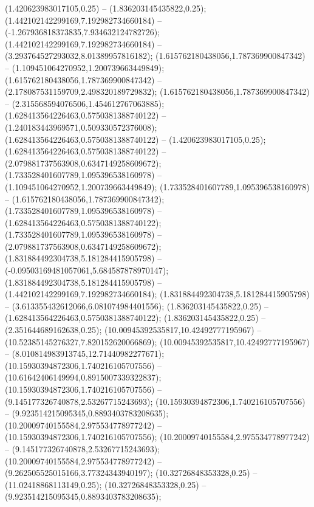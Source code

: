  (1.420623983017105,0.25) -- (1.836203145435822,0.25);
 (1.442102142299169,7.192982734660184) -- (-1.267936818373835,7.934632124782726);
 (1.442102142299169,7.192982734660184) -- (3.293764527293032,8.01389957816182);
 (1.615762180438056,1.787369900847342) -- (1.109451064270952,1.200739663449849);
 (1.615762180438056,1.787369900847342) -- (2.178087531159709,2.498320189729832);
 (1.615762180438056,1.787369900847342) -- (2.315568594076506,1.454612767063885);
 (1.628413564226463,0.5750381388740122) -- (1.240183443969571,0.509330572376008);
 (1.628413564226463,0.5750381388740122) -- (1.420623983017105,0.25);
 (1.628413564226463,0.5750381388740122) -- (2.079881737563908,0.6347149258609672);
 (1.733528401607789,1.095396538160978) -- (1.109451064270952,1.200739663449849);
 (1.733528401607789,1.095396538160978) -- (1.615762180438056,1.787369900847342);
 (1.733528401607789,1.095396538160978) -- (1.628413564226463,0.5750381388740122);
 (1.733528401607789,1.095396538160978) -- (2.079881737563908,0.6347149258609672);
 (1.831884492304738,5.181284415905798) -- (-0.09503169481057061,5.684587878970147);
 (1.831884492304738,5.181284415905798) -- (1.442102142299169,7.192982734660184);
 (1.831884492304738,5.181284415905798) -- (3.613355432612066,6.081074984401556);
 (1.836203145435822,0.25) -- (1.628413564226463,0.5750381388740122);
 (1.836203145435822,0.25) -- (2.351644689162638,0.25);
 (10.00945392535817,10.42492777195967) -- (10.52385145276327,7.820152620066869);
 (10.00945392535817,10.42492777195967) -- (8.010814983913745,12.71440982277671);
 (10.15930394872306,1.740216105707556) -- (10.61642406149994,0.8915007339322837);
 (10.15930394872306,1.740216105707556) -- (9.145177326740878,2.53267715243693);
 (10.15930394872306,1.740216105707556) -- (9.923514215095345,0.8893403783208635);
 (10.20009740155584,2.975534778977242) -- (10.15930394872306,1.740216105707556);
 (10.20009740155584,2.975534778977242) -- (9.145177326740878,2.53267715243693);
 (10.20009740155584,2.975534778977242) -- (9.262505525015166,3.77324343940197);
 (10.32726848353328,0.25) -- (11.02418868113149,0.25);
 (10.32726848353328,0.25) -- (9.923514215095345,0.8893403783208635);
